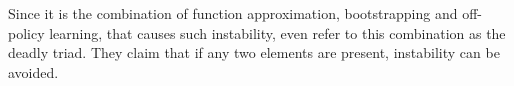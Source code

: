 Since it is the combination of function approximation, bootstrapping and off-policy learning, that causes such instability, \textcite[264]{suttonReinforcementLearningIntroduction2018a} even refer to this combination as the deadly triad. They claim that if any two elements are present, instability can be avoided. 



\endinput
